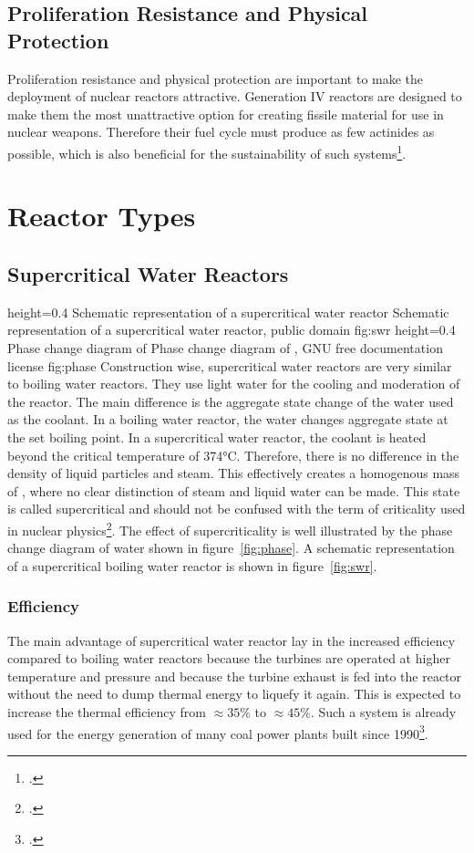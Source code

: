 \subsection{Proliferation Resistance and Physical Protection}
Proliferation resistance and physical protection are important to make the deployment of nuclear reactors
attractive. Generation IV reactors are designed to make them the most unattractive option for creating
fissile material for use in nuclear weapons. Therefore their fuel cycle must produce as few actinides
as possible, which is also beneficial for the sustainability of such systems\footcite[39]{IVHandbook}.
\section{Reactor Types}
\subsection{Supercritical Water Reactors}
    {height=0.4\textheight}
    {Schematic representation of a supercritical water reactor}
    {Schematic representation of a supercritical water reactor, public domain}
    {fig:swr}
    {height=0.4\textheight}
    {Phase change diagram of }
    {Phase change diagram of , GNU free documentation license}
    {fig:phase}
Construction wise, supercritical water reactors are very similar to boiling water reactors. They
use light water for the cooling and moderation of the reactor. The main
difference is the aggregate state change of the water used as the coolant. In a boiling water reactor, the
water changes aggregate state at the set boiling point. In a supercritical water reactor, the coolant
is heated beyond the critical temperature of 374°C. Therefore, there is no difference in the density
of liquid particles and steam. This effectively creates a homogenous mass of , where no clear
distinction of steam and liquid water can be made. This state is called supercritical and should
not be confused with the term of criticality used in nuclear physics\footcite[206-236]{IVHandbook}. The effect of supercriticality
is well illustrated by the phase change diagram of water shown in figure~\ref{fig:phase}.
A schematic representation of a supercritical boiling water reactor is shown in figure~\ref{fig:swr}.
\subsubsection{Efficiency}
The main advantage of supercritical water reactor lay in the increased efficiency compared to boiling
water reactors because the turbines are operated at higher temperature and pressure and because
the turbine exhaust is fed into the reactor without the need to dump thermal energy to liquefy it again.
This is expected to increase the thermal efficiency from $\approx35\%$ to $\approx45\%$. Such a system
is already used for the energy generation of many coal power plants built since 1990\footcite[30-51]{T4Gen}.
